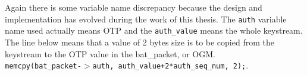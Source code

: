 Again there is some variable name discrepancy because the design and
implementation has evolved during the work of this thesis. The \texttt{auth}
variable name used actually means \ac{OTP} and the \texttt{auth\_value} means
the whole keystream. The line below means that a value of 2 bytes size is to
be copied from the keystream to the OTP value in the bat\_packet, or OGM.\\
\texttt{memcpy(bat\_packet-$>$auth, auth\_value+2*auth\_seq\_num, 2);}.

